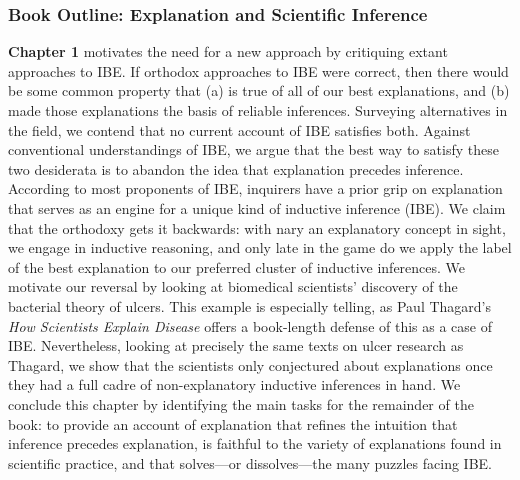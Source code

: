 \documentclass{article}[11pt]
\begin{document}




\subsubsection*{Book Outline: Explanation and Scientific Inference}

\textbf{Chapter 1 } motivates the need for a new approach by critiquing extant approaches to IBE. If orthodox approaches to IBE were correct, then there would be  some common property that (a) is true of all of our best explanations, and (b) made those explanations the basis of reliable inferences. Surveying alternatives in the field, we contend that no current account of IBE satisfies both.  Against conventional understandings of IBE, we argue that the best way to satisfy these two desiderata is to abandon the idea that explanation precedes inference. According to most proponents of IBE, inquirers have a prior grip on explanation that serves as an engine for a unique kind of inductive inference (IBE). We claim that the orthodoxy gets it backwards: with nary an explanatory concept in sight, we engage in inductive reasoning, and only late in the game do we apply the label of the best explanation to our preferred cluster of inductive inferences. We motivate our reversal by looking at biomedical scientists' discovery of the bacterial theory of ulcers. This example is especially telling, as Paul Thagard's \textit{How Scientists Explain Disease} \parencite*{Thagard1999} offers a book-length defense of this as a case of IBE. Nevertheless, looking at precisely the same texts on ulcer research as Thagard, we show that the scientists only conjectured about explanations once they had a full cadre of non-explanatory inductive inferences in hand.  We conclude this chapter by identifying the main tasks for the remainder of the book: to provide an account of explanation that refines the intuition that inference precedes explanation, is faithful to the variety of explanations found in scientific practice, and that solves---or dissolves---the many puzzles facing IBE. 
\end{document}

